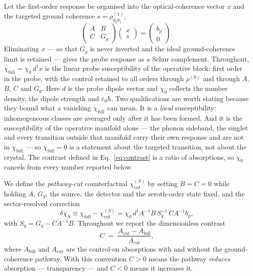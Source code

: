 \documentclass[
  reprint,
  amsmath,amssymb,
  aps,pra,
  superscriptaddress,
  floatfix,
]{revtex4-2}
\newcommand{\dchi}{\delta\chi_{S}}
\newcommand{\Acut}{A_{\mathrm{cut}}}
\newcommand{\Afull}{A_{\mathrm{full}}}
\begin{document}
Let the first-order response be organised into the optical-coherence vector
$x$ and the targeted ground coherence $s=\rho^{(1)}_{g_{2}g_{1}}$,
%
\begin{equation}
\begin{pmatrix} A & B\\ C & G_{g}\end{pmatrix}
\begin{pmatrix} x\\ s\end{pmatrix}
=\begin{pmatrix} b_{p}\\ 0\end{pmatrix}.
\label{eq:block}
\end{equation}
%
Eliminating $x$ --- so that $G_{g}$ is never inverted and the ideal
ground-coherence limit is retained --- gives the probe response as a Schur
complement. Throughout, $\chi_{\mathrm{full}}=\chi_{0}\,d^{\dagger}x$ is the
linear probe susceptibility of the operative block: first order in the probe,
with the control retained to all orders through $\rho^{(0)}$ and through $A$,
$B$, $C$ and $G_{g}$. Here $d$ is the probe dipole vector and $\chi_{0}$
collects the number density, the dipole strength and $\varepsilon_{0}\hbar$.
Two qualifications are worth stating because they bound what a vanishing
$\chi_{\mathrm{full}}$ can mean. It is a \emph{local} susceptibility:
inhomogeneous classes are averaged only after it has been formed. And it is
the susceptibility of the operative manifold alone --- the phonon sideband,
the singlet and every transition outside that manifold carry their own
response and are not in $\chi_{\mathrm{full}}$ --- so $\chi_{\mathrm{full}}=0$
is a statement about the targeted transition, not about the crystal. The
contrast defined in Eq.~\eqref{eq:contrast} is a ratio of absorptions, so
$\chi_{0}$ cancels from every number reported below.

We define the \emph{pathway-cut} counterfactual
$\chi^{(S)}_{\mathrm{cut}}$ by setting $B=C=0$ while holding $A$, $G_{g}$, the
source, the detector and the zeroth-order state fixed, and the
sector-resolved correction
%
\begin{equation}
\dchi \equiv \chi_{\mathrm{full}}-\chi^{(S)}_{\mathrm{cut}}
= \chi_{0}\, d^{\dagger}A^{-1}B\,S_{g}^{-1}\,CA^{-1}b_{p},
\label{eq:dchi}
\end{equation}
%
with $S_{g}=G_{g}-CA^{-1}B$. Throughout we report the dimensionless contrast
%
\begin{equation}
C \;=\; \frac{\Acut-\Afull}{\Acut},
\label{eq:contrast}
\end{equation}
%
where $\Afull$ and $\Acut$ are the control-on absorptions with and without the
ground-coherence pathway. With this convention $C>0$ means the pathway
\emph{reduces} absorption --- transparency --- and $C<0$ means it increases
it.
\end{document}
